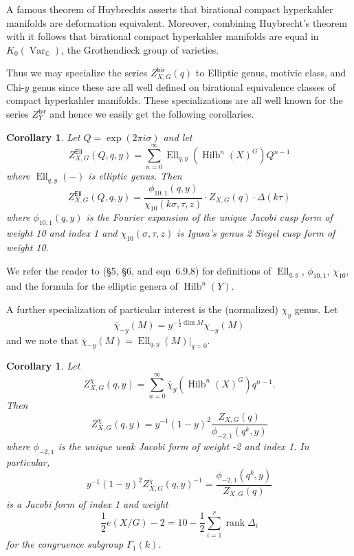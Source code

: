 \documentclass{amsart}
\newtheorem{corollary}[theorem]{Corollary}
\theoremstyle{definition}
\newcommand{\half}{\frac{1}{2}}
\newcommand{\CC} {{\mathbb C}}          %
\newcommand{\bir}{\mathsf{bir}}
\newcommand{\Ell}{\mathsf{Ell}}
\newcommand{\Ellqy}{\operatorname{Ell}_{q,y}}
\newcommand{\chibar}{\overline{\chi}}
\newcommand{\Hilb}{\operatorname{Hilb}}
\begin{document}
A famous theorem of Huybrechts \cite[Thm~4.6]{Huybrechts} asserts that
birational compact hyperkahler manifolds are deformation
equivalent. Moreover, combining Huybrecht's theorem with
\cite[Prop~3.21]{Nicaise-Shinder} it follows that birational compact
hyperkahler manifolds are equal in $K_{0}(\operatorname{Var}_{\CC})$,
the Grothendieck group of varieties.

Thus we may specialize the series $Z^{\bir}_{X,G}(q)$ to Elliptic
genus, motivic class, and Chi-$y$ genus since these are all well
defined on birational equivalence classes of compact hyperkahler
manifolds. These specializations are all well known for the series
$Z^{\bir}_{Y}$ and hence we easily get the following corollaries.

\begin{corollary}\label{cor: Zell formula}
Let $Q=\exp\left(2\pi i\sigma \right)$ and let
\[
Z^{\Ell}_{X,G}(Q,q,y) = \sum_{n=0}^{\infty} \Ellqy
\left(\Hilb^{n}(X)^{G} \right) Q^{n-1}
\]
where $\Ellqy (-)$ is elliptic genus. Then
\[
Z^{\Ell}_{X,G}(Q,q,y) = \frac{\phi_{10,1}(q ,y)}{\chi_{10}(k\sigma
,\tau ,z)} \cdot Z_{X,G}(q)\cdot \Delta (k\tau )
\]
where $\phi_{10,1}(q ,y)$ is the Fourier expansion of the unique Jacobi cusp form of weight
10 and index 1 and $\chi_{10}(\sigma ,\tau ,z)$ is Igusa's genus 2
Siegel cusp form of weight 10. 
\end{corollary}
We refer the reader to \cite{Pietromonaco_2018} (\S 5, \S 6, and
eqn~6.9.8) for definitions of $\Ellqy$, $\phi_{10,1}$, $\chi_{10}$,
and the formula for the elliptic genera of $\Hilb^{n}(Y)$.

A further specialization of particular interest is the (normalized)
$\chi_{y}$ genus. Let 
\[
\chibar_{-y}(M) = y^{-\half \dim
M}\chi_{-y}(M)
\]
and we note that $\chibar_{-y}(M) = \Ellqy
(M)|_{q=0}$.

\begin{corollary}\label{cor: Zchiy formula}
Let
\[
Z^{\chibar}_{X,G}(q,y) = \sum_{n=0}^{\infty}
\chibar_{y}\left(\Hilb^{n}(X)^{G} \right) q^{n-1} .
\]
Then
\[
Z^{\chibar}_{X,G}(q,y) = y^{-1}(1-y)^{2} \frac{Z_{X,G}(q)}{\phi_{-2,1}(q^{k},y)}
\]
where $\phi_{-2,1}$ is the unique weak Jacobi form of weight -2
and index 1. In particular,
\[
y^{-1}(1-y)^{2} Z^{\chibar}_{X,G}(q,y)^{-1} =\frac{
\phi_{-2,1}(q^{k},y)}{Z_{X,G}(q)} 
\]
is a Jacobi form of index 1 and weight 
\[
\half e(X/G)-2 = 10-\half \sum_{i=1}^{r} \operatorname{rank} \Delta_{i}
\]
for the congruence subgroup $\Gamma_{1}(k)$. 
\end{corollary}
\end{document}
